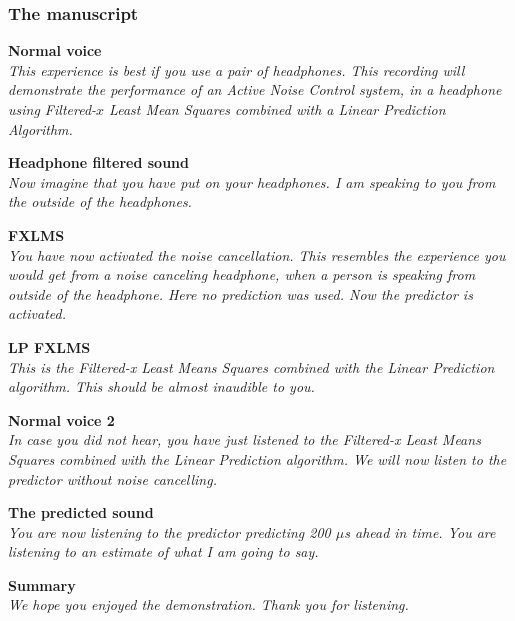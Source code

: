 \subsubsection{The manuscript}


\textbf{Normal voice}\\
\textit{This experience is best if you use a pair of headphones. 
This recording will demonstrate the performance of an Active Noise Control system, in a headphone using Filtered-$x$ Least Mean Squares combined with a Linear Prediction Algorithm. }


\textbf{Headphone filtered sound}\\
\textit{Now imagine that you have put on your headphones. I am speaking to you from the outside of the headphones.}

\textbf{FXLMS}\\
\textit{You have now activated the noise cancellation. This resembles the experience you would get from a noise canceling headphone, when a person is speaking from outside of the headphone. 
Here no prediction was used. Now the predictor is activated. }

\textbf{LP FXLMS}\\
\textit{This is the Filtered-x Least Means Squares combined with the Linear Prediction algorithm. This should be almost inaudible to you. }

\textbf{Normal voice 2}\\
\textit{In case you did not hear, you have just listened to the Filtered-x Least Means Squares combined with the Linear Prediction algorithm. We will now listen to the predictor without noise cancelling.}

\textbf{The predicted sound}\\
\textit{You are now listening to the predictor predicting 200 $\mu$s ahead in time. You are listening to an estimate of what I am going to say.}  

\textbf{Summary}\\
\textit{We hope you enjoyed the demonstration. Thank you for listening.}

%
